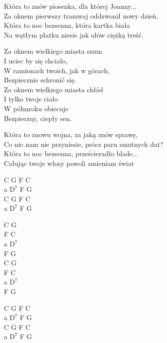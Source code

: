 \begin{text}
    Która to znów piosenka, dla której Joanny...\\
    Za oknem pierwszy tramwaj oddzwonił nowy dzień.\\
    Która to noc bezsenna, która kartka biała\\
    Na wątłym płatku niesie jak ołów ciężką treść.

    Za oknem wielkiego miasta szum\\
    I uciec by się chciało,\\
    W ramionach twoich, jak w górach,\\
    Bezpiecznie schronić się.\\
    Za oknem wielkiego miasta chłód\\
    I tylko twoje ciało\\
    W półmroku obiecuje\\
    Bezpieczny, ciepły sen.

    Która to znowu wojna, za jaką znów sprawę,\\
    Co nic nam nie przyniesie, prócz paru smutnych dat?\\
    Która to noc bezsenna, prześcieradło blade...\\
    Całując twoje włosy powoli zmieniam świat
\end{text}
\begin{chord}
    C G F C\\
    a $\mathrm{D^7}$ F G\\
    C G F C\\
    a $\mathrm{D^7}$ F G

    C G\\
    F C\\
    a $\mathrm{D^7}$\\
    F G\\
    C G\\
    F C\\
    a $\mathrm{D^7}$\\
    F G

    C G F C\\
    a $\mathrm{D^7}$ F G\\
    C G F C\\
    a $\mathrm{D^7}$ F G
\end{chord}
